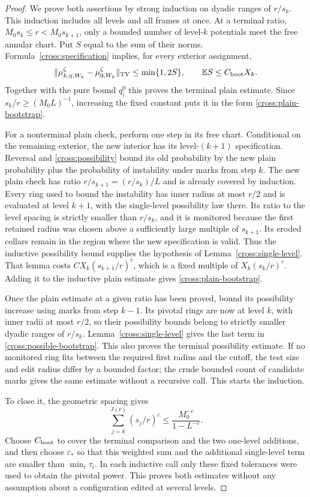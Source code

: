 \begin{proof}
We prove both assertions by strong induction on dyadic ranges of
$r/s_k$.  This induction includes all levels and all frames at once.
At a terminal ratio, $M_0s_k\leq r<M_0s_{k+1}$, only a bounded number
of level-$k$ potentials meet the free annular chart.  Put $S$ equal to
the sum of their norms.  Formula~\eqref{cross:specification} implies,
for every exterior assignment,
\[
 \|\mu_{k,\eta,W_k}^{\zeta}-\mu_{0,W_k}^{\zeta}\|_{\operatorname{TV}}
 \leq \min\{1,2S\},\qquad \mathbb E S\leq C_{\rm boot}X_k.
\]
Together with the pure bound $q_i^0$ this proves the terminal plain
estimate.  Since $s_k/r\geq(M_0L)^{-1}$, increasing the fixed constant
puts it in the form \eqref{cross:plain-bootstrap}.

For a nonterminal plain check, perform one step in its free chart.
Conditional on the remaining exterior, the new interior has its
level-$(k+1)$ specification.  Reversal and
\eqref{cross:possibility} bound its old probability by the new plain
probability plus the probability of instability under marks from step
$k$.  The new plain check has ratio $r/s_{k+1}=(r/s_k)/L$ and is already
covered by induction.  Every ring used to bound the instability has
inner radius at most $r/2$ and is evaluated at level $k+1$, with the
single-level possibility law there.  Its ratio to the level spacing is
strictly smaller than $r/s_k$, and it is monitored because the first
retained radius was chosen above a sufficiently large multiple of
$s_{k+1}$.  Its eroded collars remain in the region where the new
specification is valid.  Thus the inductive possibility bound supplies
the hypothesis of Lemma~\ref{cross:single-level}.  That lemma costs
$C X_k(s_{k+1}/r)^c$, which is a fixed multiple of
$X_k(s_k/r)^c$.  Adding it to the inductive plain estimate gives
\eqref{cross:plain-bootstrap}.

Once the plain estimate at a given ratio has been proved, bound its
possibility increase using marks from step $k-1$.  Its pivotal rings
are now at level $k$, with inner radii at most $r/2$, so their
possibility bounds belong to strictly smaller dyadic ranges of $r/s_k$.
Lemma~\ref{cross:single-level} gives the last term in
\eqref{cross:possible-bootstrap}.  This also proves the terminal
possibility estimate.  If no monitored ring fits between the required
first radius and the cutoff, the test size and edit radius differ by a
bounded factor; the crude bounded count of candidate marks gives the
same estimate without a recursive call.  This starts the induction.

To close it, the geometric spacing gives
\[
 \sum_{j=k}^{J(r)}(s_j/r)^c
 \leq \frac{M_0^{-c}}{1-L^{-c}}.
\]
Choose $C_{\rm boot}$ to cover the terminal comparison and the two
one-level additions, and then choose $\varepsilon_*$ so that this
weighted sum and the additional single-level term are smaller than
$\min_i\tau_i$.  In each inductive call only these fixed tolerances
were used to obtain the pivotal power.  This proves both estimates
without any assumption about a configuration edited at several levels.
\end{proof}


